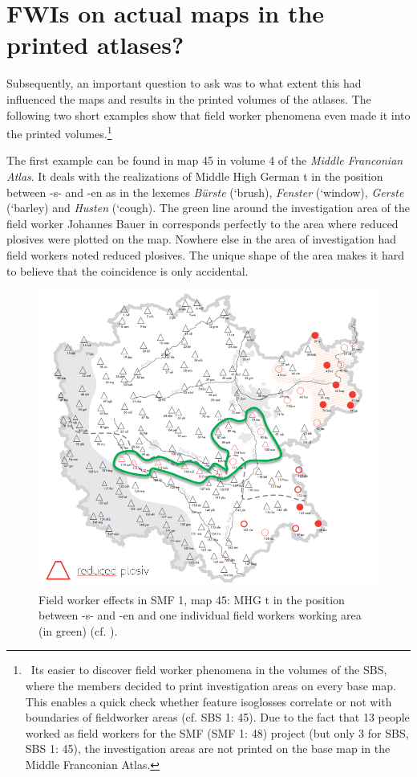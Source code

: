 \documentclass[output=paper]{LSP/langsci}
\begin{document}
\section{FWIs on actual maps in the printed atlases?}
Subsequently, an important question to ask was to what extent this had influenced the maps and results in the printed volumes of the atlases. The following two short examples show that field worker phenomena even made it into the printed volumes.\footnote{\ It{\textquotesingle}s easier to discover field worker phenomena in the volumes of the SBS, where the members decided to print investigation areas on every base map. This enables a quick check whether feature isoglosses correlate or not with boundaries of fieldworker areas (cf. SBS 1: 45). Due to the fact that 13 people worked as field workers for the SMF (SMF 1: 48) project (but only 3 for SBS, SBS 1: 45), the investigation areas are not printed on the base map in the Middle Franconian Atlas.}

The first example can be found in map 45 in volume 4 of the \textit{Middle Franconian Atlas}. It deals with the realizations of Middle High German t in the position between -s- and -en as in the lexemes \textit{Bürste} (`brush{\textquotesingle}), \textit{Fenster} (`window{\textquotesingle}), \textit{Gerste} (`barley{\textquotesingle}) and \textit{Husten} (`cough{\textquotesingle}). The green line around the investigation area of the field worker Johannes Bauer in  corresponds perfectly to the area where reduced plosives were plotted on the map. Nowhere else in the area of investigation had field workers noted reduced plosives. The unique shape of the area makes it hard to believe that the coincidence is only accidental.

\begin{figure}
\includegraphics[width=.7\textwidth]{illustrations/mathus_fig11}
\caption{Field worker effects in SMF 1, map 45: MHG t in the position between -s- and -en and one individual field worker{\textquotesingle}s working area (in green) (cf. \citealt[240]{mathussek_sprachraume_2014}).}
\label{fig:11}
\end{figure}
\end{document}
